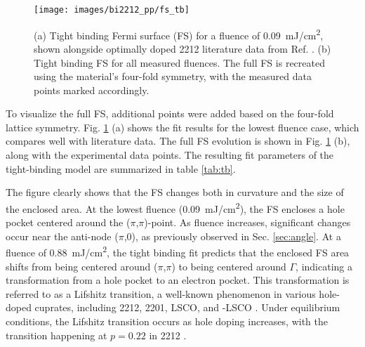 \begin{figure}
	\centering
	\texttt{[image: images/bi2212\_pp/fs\_tb]}
	\caption{(a) Tight binding Fermi surface (FS) for a fluence of \qty{0.09}{\milli\joule/\centi\meter\squared}, shown alongside optimally doped 2212 literature data from Ref. \cite{kondo_hole-concentration_2004}. (b) Tight binding FS for all measured fluences. The full FS is recreated using the material's four-fold symmetry, with the measured data points marked accordingly.}
	\label{fig:fs_tb}
\end{figure}


To visualize the full FS, additional points were added based on the four-fold lattice symmetry.
Fig. \ref{fig:fs_tb} (a) shows the fit results for the lowest fluence case, which compares well with literature data.
The full FS evolution is shown in Fig. \ref{fig:fs_tb} (b), along with the experimental data points.
The resulting fit parameters of the tight-binding model are summarized in table \ref{tab:tb}.

The figure clearly shows that the FS changes both in curvature and the size of the enclosed area.
At the lowest fluence (\qty{0.09}{\milli\joule/\centi\meter\squared}), the FS encloses a hole pocket centered around the ($\pi$,$\pi$)-point.
As fluence increases, significant changes occur near the anti-node ($\pi$,$0$), as previously observed in Sec. \ref{sec:angle}.
At a fluence of \qty{0.88}{\milli\joule/\centi\meter\squared}, the tight binding fit predicts that the enclosed FS area shifts from being centered around ($\pi$,$\pi$) to being centered around $\Gamma$, indicating a transformation from a hole pocket to an electron pocket.
This transformation is referred to as a Lifshitz transition, a well-known phenomenon in various hole-doped cuprates, including 2212, 2201, LSCO, and -LSCO \cite{kaminski_change_2006,matt_electron_2015,ding_disappearance_2019,kondo_hole-concentration_2004}.
Under equilibrium conditions, the Lifshitz transition occurs as hole doping increases, with the transition happening at $p=0.22$ in 2212 \cite{kaminski_change_2006}.

